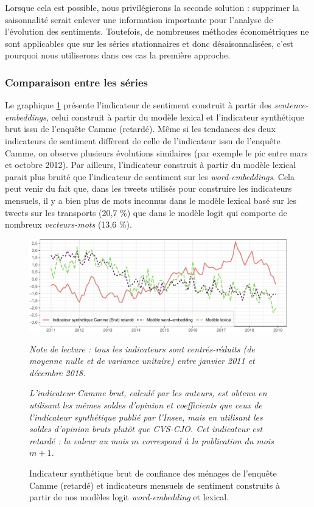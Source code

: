 \documentclass[11pt,french,french]{article}
\begin{document}
Lorsque cela est possible, nous privilégierons la seconde solution :
supprimer la saisonnalité serait enlever une information importante pour
l'analyse de l'évolution des sentiments. Toutefois, de nombreuses
méthodes économétriques ne sont applicables que sur les séries
stationnaires et donc désaisonnalisées, c'est pourquoi nous utiliserons
dans ces cas la première approche.

\subsubsection{Comparaison entre les séries}\label{subsec:compseries}

Le graphique \ref{fig:bslogcam} présente l'indicateur de sentiment
construit à partir des \emph{sentence-embeddings}, celui construit à
partir du modèle lexical et l'indicateur synthétique brut issu de
l'enquête Camme (retardé). Même si les tendances des deux indicateurs de
sentiment diffèrent de celle de l'indicateur issu de l'enquête Camme, on
observe plusieurs évolutions similaires (par exemple le pic entre mars
et octobre 2012). Par ailleurs, l'indicateur construit à partir du
modèle lexical parait plus bruité que l'indicateur de sentiment sur les
\emph{word-embeddings}. Cela peut venir du fait que, dans les tweets
utilisés pour construire les indicateurs mensuels, il y a bien plus de
mots inconnus dans le modèle lexical basé sur les tweets sur les
transports (20,7 \%) que dans le modèle logit qui comporte de nombreux
\emph{vecteurs-mots} (13,6 \%).

\begin{figure}[htp]
{\centering \includegraphics[width =\textwidth]{img/rmd-graphSentiments-1}}
\captionsetup{margin=0cm,format=hang,justification=justified}
\caption{Indicateur synthétique brut de confiance des ménages de l'enquête Camme (retardé) et indicateurs mensuels de sentiment construits à partir de nos modèles logit \emph{word-embedding} et lexical.}\label{fig:bslogcam}
\footnotesize
\emph{Note de lecture : tous les indicateurs sont centrés-réduits (de moyenne nulle et de variance unitaire) entre janvier 2011 et décembre 2018.}

\emph{L'indicateur Camme brut, calculé par les auteurs, est obtenu en utilisant les mêmes soldes d'opinion et coefficients que ceux de l'indicateur synthétique publié par l'Insee, mais en utilisant les soldes d'opinion bruts plutôt que CVS-CJO.
Cet indicateur est retardé : la valeur au mois $m$ correspond à la publication du mois $m+1$.}
\end{figure}
\end{document}
